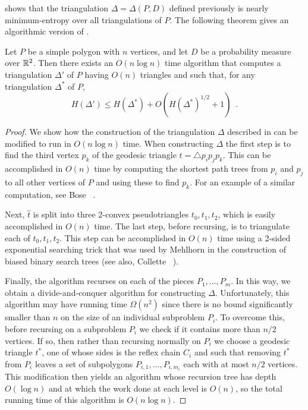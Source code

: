 \documentclass[acmtalg]{acmsmall}
\newcommand{\z}[1]{{\hat{#1}}}
\begin{document}
 shows that the triangulation
$\Delta=\Delta(P,D)$ defined previously is nearly minimum-entropy over
all triangulations of $P$.  The following theorem gives an algorithmic
version of .

\begin{thm}
Let $P$ be a simple polygon with $n$ vertices, and let $D$ be a
probability measure over $\mathbb{R}^2$.  Then there exists an $O(n\log n)$
time algorithm that computes a triangulation $\Delta'$ of $P$ having
$O(n)$ triangles and such that, for any triangulation $\Delta^*$ of
$P$,
\[
    H(\Delta') \le H(\Delta^*) + O(H(\Delta^*)^{1/2}+1) \enspace .
\]
\end{thm}

\begin{proof}
We show how the construction of the triangulation $\Delta$ described in
 can be modified to run in $O(n\log n)$ time.  When
constructing $\Delta$ the first step is to find the third vertex $p_k$ of the
geodesic triangle $t=\triangle p_i p_j p_k$.  This can be accomplished
in $O(n)$ time by computing the shortest path trees from $p_i$ and
$p_j$ to all other vertices of $P$ and using these to find $p_k$.  For
an example of a similar computation, see Bose \etal\
\cite[Section~2.2]{bdhlim07}.

Next, $\z t$ is split into three 2-convex pseudotriangles $t_0,t_1,t_2$,
which is easily accomplished in $O(n)$ time.  The last step, before
recursing, is to triangulate each of $t_0,t_1,t_2$.  This step can be
accomplished in $O(n)$ time using a 2-sided exponential searching
trick that was used by Mehlhorn \cite{m75} in the construction of
biased binary search trees (see also, Collette \etal\
\cite[Theorem~1]{cdilm08}).

Finally, the algorithm recurses on each of the pieces
$P_1,\ldots,P_m$.  In this way, we obtain a divide-and-conquer
algorithm for constructing $\Delta$.  Unfortunately, this algorithm
may have running time $\Omega(n^2)$ since there is no bound
significantly smaller than $n$ on the size of an individual subproblem
$P_i$.  To overcome this, before recursing on a subproblem $P_i$ we
check if it contains more than $n/2$ vertices.  If so, then rather
than recursing normally on $P_i$ we choose a geodesic triangle $t^*$,
one of whose sides is the reflex chain $C_i$ and such that removing
$t^*$ from $P_i$ leaves a set of subpolygons
$P_{i,1},\ldots,P_{i,m_i}$ each with at most $n/2$ vertices.  This
modification then yields an algorithm whose recursion tree has depth
$O(\log n)$ and at which the work done at each level is $O(n)$, so the
total running time of this algorithm is $O(n\log n)$.


\end{proof}
\end{document}
